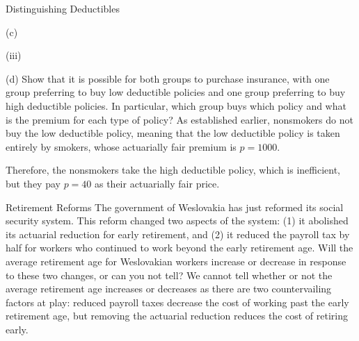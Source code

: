\documentclass[8pt]{extarticle}
\begin{document}
\begin{problem}{Distinguishing Deductibles}
\begin{problem}{(c)}
\begin{problem}{(iii)}
      \end{problem}
    \end{problem}
    \begin{problem}{(d)}
      Show that it is possible for both groups to purchase insurance, with one group preferring to buy low deductible policies and one group preferring to buy high deductible policies. In particular, which group buys which policy and what is the premium for each type of policy?
      \tcblower
      As established earlier, nonsmokers do not buy the low deductible policy, meaning that the low deductible policy is taken entirely by smokers, whose actuarially fair premium is $p = 1000$.\newline

      Therefore, the nonsmokers take the high deductible policy, which is inefficient, but they pay $p = 40$ as their actuarially fair price.
    \end{problem}
  \end{problem}
  \begin{problem}{Retirement Reforms}
    The government of Weslovakia has just reformed its social security system. This reform changed two aspects of the system: (1) it abolished its actuarial reduction for early retirement, and (2) it reduced the payroll tax by half for workers who continued to work beyond the early retirement age. Will the average retirement age for Weslovakian workers increase or decrease in response to these two changes, or can you not tell?
    \tcblower
    We cannot tell whether or not the average retirement age increases or decreases as there are two countervailing factors at play: reduced payroll taxes decrease the cost of working past the early retirement age, but removing the actuarial reduction reduces the cost of retiring early. 
  \end{problem}
\end{document}
